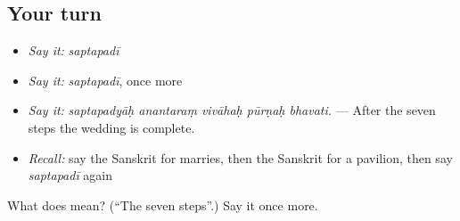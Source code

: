 \subsection*{Your turn}
\begin{itemize}
\raggedright
  \item \emph{Say it:} \emph{saptapadī}
  \item \emph{Say it:} \emph{saptapadī}, once more
  \item \emph{Say it:} \emph{saptapadyāḥ anantaraṃ vivāhaḥ pūrṇaḥ bhavati.} — After the seven steps the wedding is complete.
  \item \emph{Recall:} say the Sanskrit for marries, then the Sanskrit for a pavilion, then say \emph{saptapadī} again
\end{itemize}

\begin{tcolorbox}[breakable,colback=teal!4,colframe=teal!35!black,title={Before you move on}]
What does  mean? (\textquotedblleft{}The seven steps\textquotedblright{}.) Say it once more.
\end{tcolorbox}
